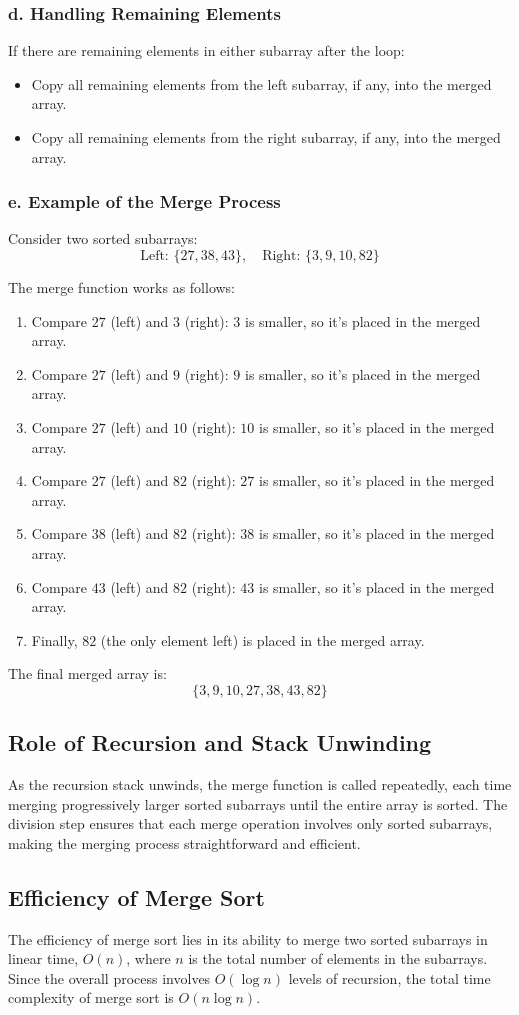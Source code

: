 \documentclass{article}
\begin{document}
\subsubsection*{d. Handling Remaining Elements}
If there are remaining elements in either subarray after the loop:
\begin{itemize}
    \item Copy all remaining elements from the left subarray, if any, into the merged array.
    \item Copy all remaining elements from the right subarray, if any, into the merged array.
\end{itemize}

\subsubsection*{e. Example of the Merge Process}
Consider two sorted subarrays:
\[
\text{Left: } \{27, 38, 43\}, \quad \text{Right: } \{3, 9, 10, 82\}
\]

The merge function works as follows:
\begin{enumerate}
    \item Compare \(27\) (left) and \(3\) (right): \(3\) is smaller, so it’s placed in the merged array.
    \item Compare \(27\) (left) and \(9\) (right): \(9\) is smaller, so it’s placed in the merged array.
    \item Compare \(27\) (left) and \(10\) (right): \(10\) is smaller, so it’s placed in the merged array.
    \item Compare \(27\) (left) and \(82\) (right): \(27\) is smaller, so it’s placed in the merged array.
    \item Compare \(38\) (left) and \(82\) (right): \(38\) is smaller, so it’s placed in the merged array.
    \item Compare \(43\) (left) and \(82\) (right): \(43\) is smaller, so it’s placed in the merged array.
    \item Finally, \(82\) (the only element left) is placed in the merged array.
\end{enumerate}
The final merged array is:
\[
\{3, 9, 10, 27, 38, 43, 82\}
\]

\subsection*{Role of Recursion and Stack Unwinding}
As the recursion stack unwinds, the merge function is called repeatedly, each time merging progressively larger sorted subarrays until the entire array is sorted. The division step ensures that each merge operation involves only sorted subarrays, making the merging process straightforward and efficient.

\subsection*{Efficiency of Merge Sort}
The efficiency of merge sort lies in its ability to merge two sorted subarrays in linear time, \(O(n)\), where \(n\) is the total number of elements in the subarrays. Since the overall process involves \(O(\log n)\) levels of recursion, the total time complexity of merge sort is \(O(n \log n)\).
\end{document}

